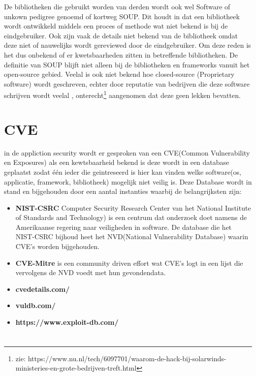 De bibliotheken die gebruikt worden van derden wordt ook wel Software of unkown pedigree genoemd of kortweg SOUP. Dit houdt in dat een bibliotheek wordt ontwikkeld middels een proces of methode wat niet bekend is bij de eindgebruiker. Ook zijn vaak de details niet bekend van de bibliotheek omdat deze niet of nauwelijks wordt gereviewed door de eindgebruiker. Om deze reden is het dus onbekend of er kwetsbaarheden zitten in betreffende bibliotheken.
De definitie van SOUP blijft niet alleen bij de bibliotheken en frameworks vanuit het open-source gebied. Veelal is ook niet bekend hoe closed-source (Proprietary software) wordt geschreven, echter door reputatie van bedrijven die deze software schrijven wordt veelal , onterecht\footnote{zie: https://www.nu.nl/tech/6097701/waarom-de-hack-bij-solarwinds-ministeries-en-grote-bedrijven-treft.html } aangenomen dat deze geen lekken bevatten.

\section{CVE}
in de appliction security wordt er gesproken van een CVE(Common Vulnerability en Exposures) als een kewtsbaarheid bekend is deze wordt in een database geplaatst zodat \'e\'en ieder die geintreseerd is hier kan vinden welke software(os, applicatie, framework, bibliotheek) mogelijk niet veilig is. Deze Database wordt in stand en bijgehouden door een aantal instanties waarbij de belangrijksten zijn:
\begin{itemize}
    \item \textbf{NIST-CSRC} Computer Security Research Center van het National Institute of Standards and Technology) is een centrum dat onderzoek doet namens de Amerikaanse regering naar veiligheden in software. De database die het NIST-CSRC bijhoud heet het NVD(National Vulnerability Database) waarin CVE's worden bijgehouden.
    \item \textbf{CVE-Mitre} is een community driven effort wat CVE's logt in een lijst die vervolgens de NVD voedt met hun gevondendata.
    \item \textbf{cvedetails.com/}
    \item \textbf{vuldb.com/}
    \item \textbf{https://www.exploit-db.com/}
\end{itemize}

\section{}

